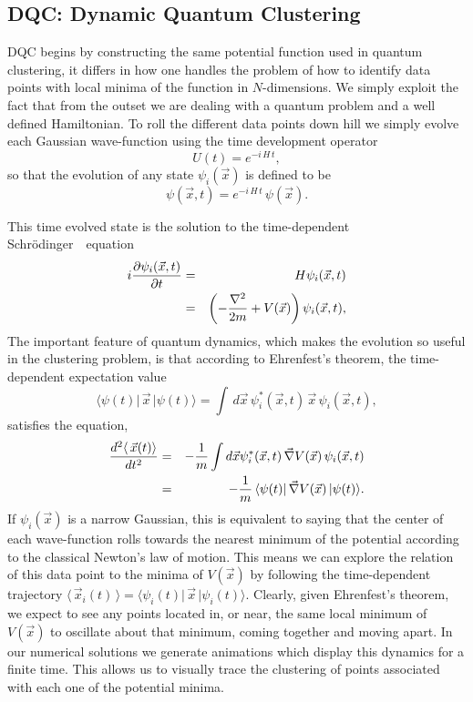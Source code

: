 \documentclass[fleqn,twoside]{article}
\def\be{\begin{equation}}
\def\ee{\end{equation}}
\newcommand{\ba}{\begin{eqnarray}}
\newcommand{\ea}{\end{eqnarray}}
\newcommand{\x}{\mbox{$\vec{x}$}}
\def\ket#1{\vert #1 \rangle}
\def\bra#1{\langle #1 \vert}
\newcommand{\Schrodinger}{Schr\"odinger\ }
\begin{document}
\subsection{DQC: Dynamic Quantum Clustering}

DQC begins by constructing the same potential function used
in quantum clustering, it differs in how one handles the
problem of how to identify data points with local minima of
the function in $N$-dimensions.  We simply exploit
the fact that from the outset we are dealing with a
quantum problem and a well defined Hamiltonian.  To roll
the different data points down hill we simply evolve each
Gaussian wave-function using the time development operator
\be
    U(t) = e^{-i\,H\,t},
\ee
so that the evolution of any state $\psi_i(\vec{x})$ is
defined to be
\be
    \psi(\vec{x},t) = e^{-i\,H\,t}\,\psi(\vec{x}).
\ee

This time evolved state is the solution to the time-dependent
\Schrodinger\ equation
\ba
\label{Schdeqn}
i {\partial \psi_i(\vec{x},t) \over
\partial t}
&=& H \psi_i(\vec{x},t) \nonumber\\
&=& \left(-{\nabla^2 \over 2m}
+ V(\vec{x})\right)\psi_i(\vec{x},t) ,
\ea
The important feature of quantum dynamics, which makes the evolution
so useful in the clustering problem, is that according to Ehrenfest's
theorem, the time-dependent expectation value
\be
 \bra{\psi(t)}\,\x\, \ket{\psi(t)} = \int\,d\x \, \psi^\ast_i(\vec{x},t)\,
\x\,\psi_i(\vec{x},t) ,
\ee
satisfies the equation,
\ba
   { d^2  \langle\,\vec{x}(t) \rangle \over dt^2} &=&
   - {1 \over m}  \int d\vec{x}
 \psi^\ast_i(\vec{x},t)\,\vec{\nabla}V(\vec{x}) \,\psi_i(\vec{x},t) \\
 &=&- {1 \over m}\, \bra{\psi(t)}\,\vec{\nabla}V(\vec{x})\,\ket{\psi(t)} .
\ea
If $\psi_i(\x)$ is a narrow Gaussian, this is equivalent
to saying that the center of each wave-function rolls towards
the nearest minimum of the potential according to the classical
Newton's law of motion.  This means we can explore the relation of
this data point to the minima of $V(\vec{x})$ by following the
time-dependent trajectory $\langle\,\vec{x}_i(t) \,\rangle =
\bra{\psi_i(t)}\,\vec{x}\,\ket{\psi_i(t)}$.
Clearly, given Ehrenfest's theorem, we expect to see any points
located in, or near, the same local minimum of $V(\vec{x})$ to
oscillate about that minimum, coming together and moving apart. In
our numerical solutions we generate animations which display
this dynamics for a finite time.
This allows us to visually trace the clustering of points associated with
each one of the potential minima.
\end{document}
